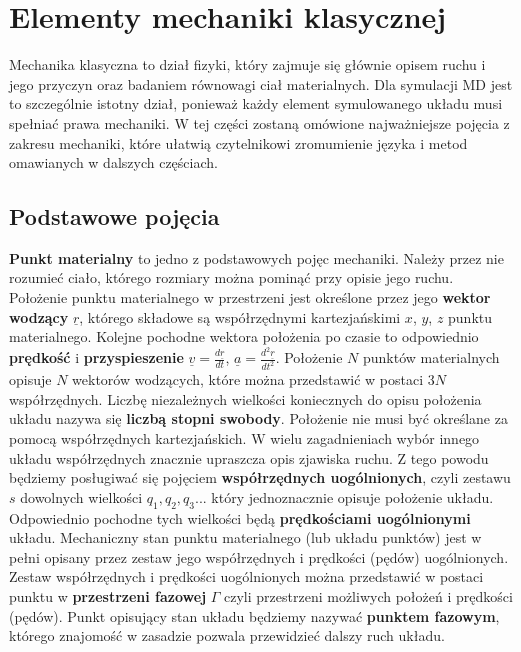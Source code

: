 \documentclass[12pt,a4paper,openright]{report} %
\begin{document}
\section{Elementy mechaniki klasycznej}
Mechanika klasyczna to dział fizyki, który zajmuje się głównie opisem ruchu i jego przyczyn oraz badaniem równowagi ciał materialnych. Dla symulacji MD jest to szczególnie istotny dział, ponieważ każdy element symulowanego układu musi spełniać prawa mechaniki. W tej części zostaną omówione najważniejsze pojęcia z zakresu mechaniki, które ułatwią czytelnikowi zromumienie języka i metod omawianych w dalszych częściach.
\subsection{Podstawowe pojęcia}
\textbf{Punkt materialny} to jedno z podstawowych pojęc mechaniki. Należy przez nie rozumieć ciało, którego rozmiary można pominąć przy opisie jego ruchu. 
Położenie punktu materialnego w przestrzeni jest określone przez jego \textbf{wektor wodzący} $\underline{r}$, którego składowe są współrzędnymi kartezjańskimi $x$, $y$, $z$ punktu materialnego. Kolejne pochodne wektora położenia po czasie to odpowiednio \textbf{prędkość} i \textbf{przyspieszenie} $\underline{v}=\frac{d \underline{r}}{dt}$, $\underline{a}=\frac{d^2 \underline{r}}{dt^2}$. Położenie $N$ punktów materialnych opisuje $N$ wektorów wodzących, które można przedstawić w postaci $3N$ współrzędnych. Liczbę niezależnych wielkości koniecznych do opisu położenia układu nazywa się \textbf{liczbą stopni swobody}. Położenie nie musi być określane za pomocą współrzędnych kartezjańskich. W wielu zagadnieniach wybór innego układu współrzędnych znacznie upraszcza opis zjawiska ruchu. Z tego powodu będziemy posługiwać się pojęciem \textbf{współrzędnych uogólnionych}, czyli zestawu $s$ dowolnych wielkości $q_1, q_2, q_3...$ który jednoznacznie opisuje położenie układu. Odpowiednio pochodne tych wielkości będą \textbf{prędkościami uogólnionymi} układu. Mechaniczny stan punktu materialnego (lub układu punktów) jest w pełni opisany przez zestaw jego współrzędnych i prędkości (pędów) uogólnionych. Zestaw współrzędnych i prędkości uogólnionych można przedstawić w postaci punktu w \textbf{przestrzeni fazowej} $\Gamma$ czyli przestrzeni możliwych położeń i prędkości (pędów). Punkt opisujący stan układu będziemy nazywać \textbf{punktem fazowym}, którego znajomość w zasadzie pozwala przewidzieć dalszy ruch układu.   
\end{document}
